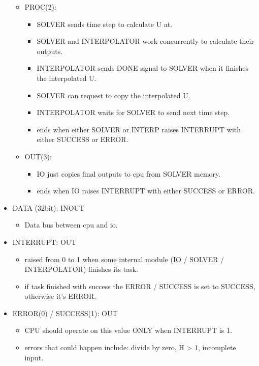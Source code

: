 \documentclass[12pt]{report}
\begin{document}
\begin{itemize}
\begin{itemize}
        \item PROC(2):
        \begin{itemize}
            \item SOLVER sends time step to calculate {U} at.
            \item SOLVER and INTERPOLATOR work concurrently to calculate their outputs.
            \item INTERPOLATOR sends {DONE} signal to SOLVER when it finishes the interpolated U.
            \item SOLVER can request to copy the interpolated {U}.
            \item INTERPOLATOR waits for SOLVER to send next time step.
            \item ends when either SOLVER or INTERP raises INTERRUPT with either {SUCCESS} or {ERROR}.
        \end{itemize}
        \item OUT(3):
        \begin{itemize}
            \item IO just copies final outputs to cpu from SOLVER memory.
            \item ends when IO raises INTERRUPT with either {SUCCESS} or {ERROR}.
        \end{itemize}
    \end{itemize}
    \item DATA (32bit): INOUT
    \begin{itemize}
        \item Data bus between cpu and io.
    \end{itemize}
    \item INTERRUPT: OUT
    \begin{itemize}
        \item raised from 0 to 1 when some internal module (IO / SOLVER / INTERPOLATOR) finishes its task.
        \item if task finished with success the {ERROR / SUCCESS} is set to {SUCCESS}, otherwise it's {ERROR}.
    \end{itemize}
    \item ERROR(0) / SUCCESS(1): OUT
    \begin{itemize}
        \item CPU should operate on this value ONLY when {INTERRUPT} is 1.
        \item errors that could happen include: divide by zero, H > 1, incomplete input.
    \end{itemize}
\end{itemize}
\end{document}
